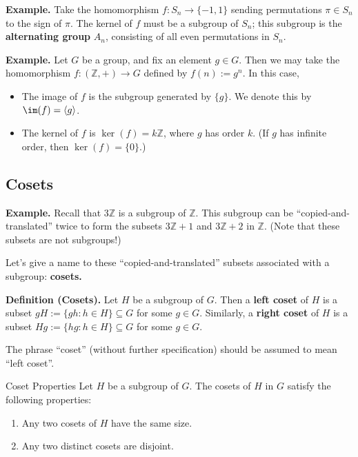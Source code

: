 \textbf{Example.} Take the homomorphism $f: S_n \to \{-1, 1\}$ sending permutations $\pi \in S_n$ to the sign of $\pi$.  The kernel of $f$ must be a subgroup of $S_n$; this subgroup is the \textbf{alternating group} $A_n$, consisting of all even permutations in $S_n$.

\textbf{Example.} Let $G$ be a group, and fix an element $g \in G$.  Then we may take the homomorphism $f: (\mathbb{Z}, +) \to G$ defined by $f(n) := g^n$.  In this case,
\begin{itemize}
    \item The image of $f$ is the subgroup generated by $\{g\}$.  We denote this by $\im(f) = \langle g \rangle$.
    \item The kernel of $f$ is $\ker(f) = k\mathbb{Z}$, where $g$ has order $k$.  (If $g$ has infinite order, then $\ker(f) = \{0\}$.)
\end{itemize}

\subsection{Cosets}

\textbf{Example.} Recall that $3\mathbb{Z}$ is a subgroup of $\mathbb{Z}$.  This subgroup can be ``copied-and-translated'' twice to form the subsets $3\mathbb{Z} + 1$ and $3\mathbb{Z} + 2$ in $\mathbb{Z}$.  (Note that these subsets are not subgroups!)

Let's give a name to these ``copied-and-translated'' subsets associated with a subgroup: \textbf{cosets.}

\textbf{Definition (Cosets).} Let $H$ be a subgroup of $G$.  Then a \textbf{left coset} of $H$ is a subset $gH := \{gh : h \in H\} \subseteq G$ for some $g \in G$.  Similarly, a \textbf{right coset} of $H$ is a subset $Hg := \{hg : h \in H\} \subseteq G$ for some $g \in G$.

The phrase ``coset'' (without further specification) should be assumed to mean ``left coset''.

\begin{theorem}{Coset Properties}
    Let $H$ be a subgroup of $G$.  The cosets of $H$ in $G$ satisfy the following properties:
    \begin{enumerate}
        \item Any two cosets of $H$ have the same size.
        \item Any two distinct cosets are disjoint.
    \end{enumerate}
\end{theorem}

